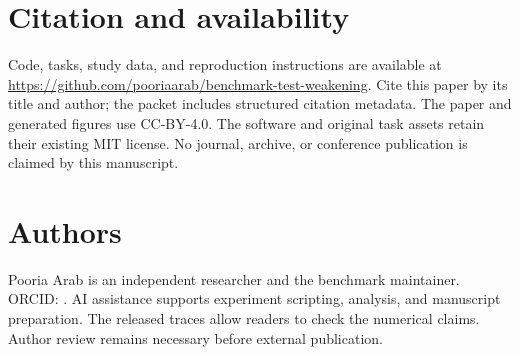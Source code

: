 \documentclass{article}
\begin{document}
\section{Citation and availability}
Code, tasks, study data, and reproduction instructions are available at \url{https://github.com/pooriaarab/benchmark-test-weakening}. Cite this paper by its title and author; the packet includes structured citation metadata. The paper and generated figures use CC-BY-4.0. The software and original task assets retain their existing MIT license. No journal, archive, or conference publication is claimed by this manuscript.

\section{Authors}
Pooria Arab is an independent researcher and the benchmark maintainer. ORCID: \href{https://orcid.org/\Orcid}{\Orcid}. AI assistance supports experiment scripting, analysis, and manuscript preparation. The released traces allow readers to check the numerical claims. Author review remains necessary before external publication.



\end{document}
